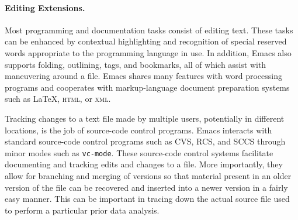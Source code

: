 \documentclass{article}
\newcommand{\stexttt}[1]{{\small\texttt{#1}}}
\begin{document}



\paragraph{Editing Extensions.}
Most programming and documentation tasks consist of editing text.
These tasks can be enhanced by contextual highlighting and recognition
of special reserved words appropriate to the programming language in
use.  In addition, Emacs also supports folding, outlining, tags, and
bookmarks, all of which assist with maneuvering around a file.  Emacs
shares many features with word processing programs and cooperates with
markup-language document preparation systems such as \LaTeX,
\textsc{html}, or \textsc{xml}.

Tracking changes to a text file made by multiple users, potentially in
different locations, is the job of source-code control programs.
Emacs interacts with standard source-code control programs such as
CVS, RCS, and SCCS through minor modes such as \stexttt{vc-mode}.
These source-code control systems facilitate documenting and tracking
edits and changes to a file.  More importantly, they allow for
branching and merging of versions so that material present in an older
version of the file can be recovered and inserted into a newer version
in a fairly easy manner.  This can be important in tracing down the
actual source file used to perform a particular prior data analysis.
\end{document}

